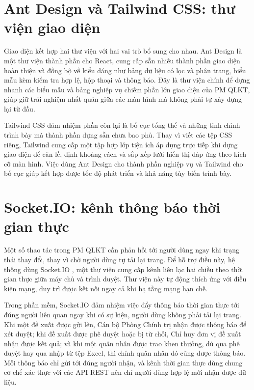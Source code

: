 \documentclass[../DoAn.tex]{subfiles}
\begin{document}
\section{Ant Design và Tailwind CSS: thư viện giao diện}
\label{section:3.4}

Giao diện kết hợp hai thư viện với hai vai trò bổ sung cho nhau. Ant Design \cite{antdesign} là một thư viện thành phần cho React, cung cấp sẵn nhiều thành phần giao diện hoàn thiện và đồng bộ về kiểu dáng như bảng dữ liệu có lọc và phân trang, biểu mẫu kèm kiểm tra hợp lệ, hộp thoại và thông báo. Đây là thư viện chính để dựng nhanh các biểu mẫu và bảng nghiệp vụ chiếm phần lớn giao diện của PM QLKT, giúp giữ trải nghiệm nhất quán giữa các màn hình mà không phải tự xây dựng lại từ đầu.

Tailwind CSS \cite{tailwind} đảm nhiệm phần còn lại là bố cục tổng thể và những tinh chỉnh trình bày mà thành phần dựng sẵn chưa bao phủ. Thay vì viết các tệp CSS riêng, Tailwind cung cấp một tập hợp lớp tiện ích áp dụng trực tiếp khi dựng giao diện để căn lề, định khoảng cách và sắp xếp lưới hiển thị đáp ứng theo kích cỡ màn hình. Việc dùng Ant Design cho thành phần nghiệp vụ và Tailwind cho bố cục giúp kết hợp được tốc độ phát triển và khả năng tùy biến trình bày.

\section{Socket.IO: kênh thông báo thời gian thực}
\label{section:3.5}

Một số thao tác trong PM QLKT cần phản hồi tới người dùng ngay khi trạng thái thay đổi, thay vì chờ người dùng tự tải lại trang. Để hỗ trợ điều này, hệ thống dùng Socket.IO \cite{socketio}, một thư viện cung cấp kênh liên lạc hai chiều theo thời gian thực giữa máy chủ và trình duyệt. Thư viện này tự động thích ứng với điều kiện mạng, duy trì được kết nối ngay cả khi hạ tầng mạng hạn chế.

Trong phần mềm, Socket.IO đảm nhiệm việc đẩy thông báo thời gian thực tới đúng người liên quan ngay khi có sự kiện, người dùng không phải tải lại trang. Khi một đề xuất được gửi lên, Cán bộ Phòng Chính trị nhận được thông báo để xét duyệt; khi đề xuất được phê duyệt hoặc bị từ chối, Chỉ huy đơn vị đề xuất nhận được kết quả; và khi một quân nhân được trao khen thưởng, dù qua phê duyệt hay qua nhập từ tệp Excel, thì chính quân nhân đó cũng được thông báo. Mỗi thông báo chỉ gửi tới đúng người nhận, và kênh thời gian thực dùng chung cơ chế xác thực với các API REST nên chỉ người dùng hợp lệ mới nhận được dữ liệu.
\end{document}
